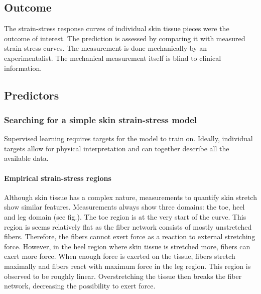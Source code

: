 \subsection{Outcome}
The strain-stress response curves of individual skin tissue pieces were the outcome of interest.
The prediction is assessed by comparing it with measured strain-stress curves.
The measurement is done mechanically by an experimentalist.
The mechanical measurement itself is blind to clinical information.

\subsection{Predictors}\label{sec:skin_predictors}


\subsubsection{Searching for a simple skin strain-stress model}

Supervised learning requires targets for the model to train on.
Ideally, individual targets allow for physical interpretation and can together describe all the available data.

\paragraph{Empirical strain-stress regions}
Although skin tissue has a complex nature, measurements to quantify skin stretch show similar features.
Measurements always show three domains: the toe, heel and leg domain (see fig.).
The toe region is at the very start of the curve.
This region is seems relatively flat as the fiber network consists of mostly unstretched fibers.
Therefore, the fibers cannot exert force as a reaction to external stretching force.
However, in the heel region where skin tissue is stretched more, fibers can exert more force.
When enough force is exerted on the tissue, fibers stretch maximally and fibers react with maximum force in the leg region.
This region is observed to be roughly linear.
Overstretching the tissue then breaks the fiber network, decreasing the possibility to exert force.

